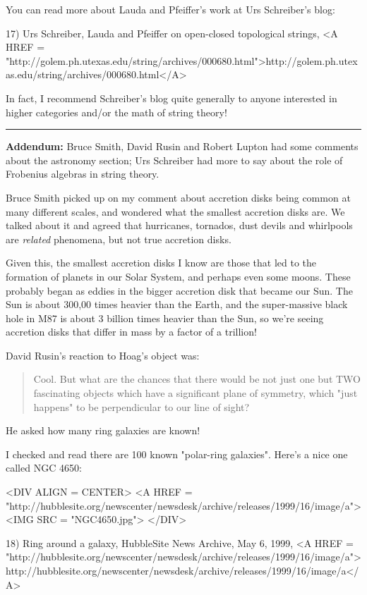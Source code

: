 You can read more about Lauda and Pfeiffer's work at Urs Schreiber's
blog:

17) Urs Schreiber, Lauda and Pfeiffer on open-closed topological strings,
<A HREF = "http://golem.ph.utexas.edu/string/archives/000680.html">http://golem.ph.utexas.edu/string/archives/000680.html</A>

In fact, I recommend Schreiber's blog quite generally to anyone interested 
in higher categories and/or the math of string theory!

 

\par\noindent\rule{\textwidth}{0.4pt}
\textbf{Addendum:} Bruce Smith, David Rusin and Robert Lupton 
had some comments about the astronomy section; Urs Schreiber 
had more to say about the role of Frobenius algebras in string theory.

Bruce Smith picked up on my comment about accretion disks being
common at many different scales, 
and wondered what the smallest accretion disks are.  We talked about
it and agreed that hurricanes, tornados, dust devils and whirlpools are
\emph{related} phenomena, but not true accretion disks.  

Given this,
the smallest accretion disks I know are those that led to the formation
of planets in our Solar System, and perhaps even some moons.  These 
probably began as eddies in the bigger accretion disk that became our Sun.
The Sun is about 300,00 times heavier than the Earth, and the super-massive
black hole in M87 is about 3 billion times heavier than the Sun, so we're
seeing accretion disks that differ in mass by a factor of a trillion!

David Rusin's reaction to Hoag's object was:

\begin{quote}
 Cool. But what are the chances that there would be not just one but
 TWO fascinating objects which have a significant plane of symmetry, 
 which "just happens" to be perpendicular to our line of sight?
\end{quote}

He asked how many ring galaxies are known!   

I checked and read
there are 100 known "polar-ring galaxies".  Here's a nice one 
called NGC 4650:


<DIV ALIGN = CENTER>
<A HREF = "http://hubblesite.org/newscenter/newsdesk/archive/releases/1999/16/image/a">
<IMG SRC = "NGC4650.jpg">
</DIV>

18) Ring around a galaxy, HubbleSite News Archive, May 6, 1999, 
<A HREF = "http://hubblesite.org/newscenter/newsdesk/archive/releases/1999/16/image/a">
http://hubblesite.org/newscenter/newsdesk/archive/releases/1999/16/image/a</A>

